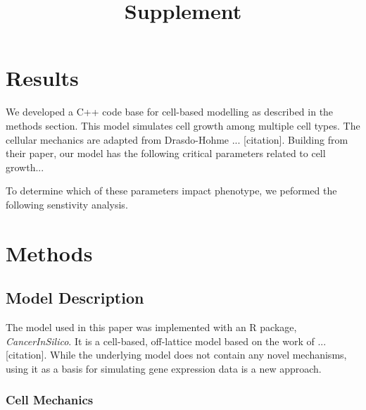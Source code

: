 \documentclass{article}
\begin{document}
	
\title{Supplement}
\date{\vspace{-5ex}}
\maketitle

\tableofcontents

\section{Results}

We developed a C++ code base for cell-based modelling as described in the methods section. This model simulates cell growth among multiple cell types. The cellular mechanics are adapted from Drasdo-Hohme ... [citation]. Building from their paper, our model has the following critical parameters related to cell growth...

To determine which of these parameters impact phenotype, we peformed the following senstivity analysis.

\section{Methods}

\subsection{Model Description}

The model used in this paper was implemented with an R package, \textit{CancerInSilico}. It is a cell-based, off-lattice model based on the work of ... [citation]. While the underlying model does not contain any novel mechanisms, using it as a basis for simulating gene expression data is a new approach.

\subsubsection{Cell Mechanics}
\end{document}
